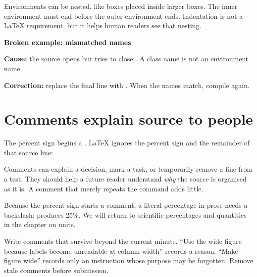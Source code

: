 Environments can be nested, like boxes placed inside larger boxes. The inner
environment must end before the outer environment ends. Indentation is not a
\LaTeX{} requirement, but it helps human readers see that nesting.

\begin{commonerror}
\textbf{Broken example: mismatched names}


\textbf{Cause:} the source opens  but tries to close
. A class name is not an environment name.

\textbf{Correction:} replace the final line with
. When the names match, compile again.
\end{commonerror}

\section{Comments explain source to people}

The percent sign begins a . \LaTeX{} ignores the percent sign and
the remainder of that source line:


Comments can explain a decision, mark a task, or temporarily remove a line
from a test. They should help a future reader understand \emph{why} the source
is organised as it is. A comment that merely repeats the command adds little.

Because the percent sign starts a comment, a literal percentage in prose needs
a backslash: \code{25\textbackslash\%} produces 25\%. We will return to
scientific percentages and quantities in the chapter on units.

\begin{goodpractice}
Write comments that survive beyond the current minute. ``Use the wide figure
because labels become unreadable at column width'' records a reason. ``Make
figure wide'' records only an instruction whose purpose may be forgotten.
Remove stale comments before submission.
\end{goodpractice}

